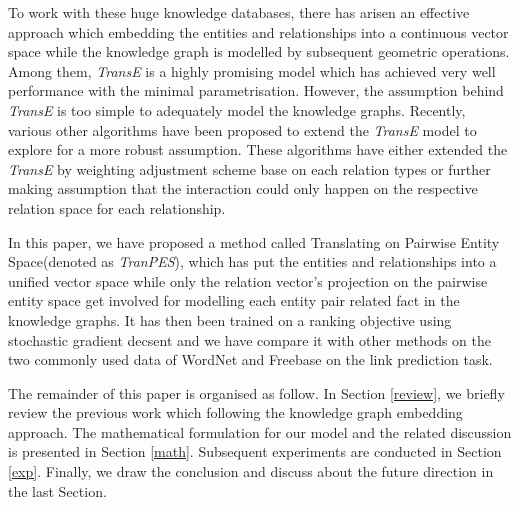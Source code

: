 \documentclass[9pt]{sig-alternate-05-2015}
\begin{document}
To work with these huge knowledge databases, there has arisen an effective approach which embedding the entities and relationships into a continuous vector space while the knowledge graph is modelled by subsequent geometric operations. Among them, \emph{TransE} \cite{bordes_translating_2013} is a highly promising model which has achieved very well performance with the minimal parametrisation. However, the assumption behind \emph{TransE} is too simple to adequately model the knowledge graphs. Recently, various other algorithms \cite{fan_transition-based_2014} \cite{wang_knowledge_2014} \cite{lin_learning_2015} \cite{garcia-duran_composing_????}  have been proposed to extend the \emph{TransE} model to explore for a more robust assumption. These algorithms have either extended the \emph{TransE} by   weighting adjustment scheme base on each relation types  or further making assumption that the interaction could only happen on the respective relation space for each relationship. 

In this paper, we have proposed a method called Translating on Pairwise Entity Space(denoted as \emph{TranPES}),  which has put the entities and relationships into a unified vector space while only the relation vector's projection on the pairwise entity space get involved for modelling each entity pair related fact in the knowledge graphs. It has then been trained on a ranking objective using stochastic gradient decsent and we have compare it with other methods on the two commonly used data  of WordNet \cite{miller_wordnet:_1995} and Freebase \cite{bollacker_freebase:_2008} on the link prediction task.

The remainder of this paper is organised as follow. In Section \ref{review}, we briefly review the previous work which following the knowledge graph embedding approach. The mathematical formulation for our model and the related discussion is presented in Section \ref{math}. Subsequent experiments are conducted in Section \ref{exp}. Finally, we draw the conclusion and discuss about the future direction in the last Section.
\end{document}
